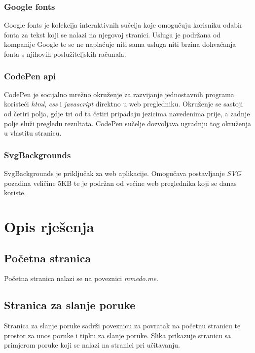 \documentclass[times, utf8, zavrsni, numeric]{fer}
\begin{document}
\subsection{Google fonts}
\qquad Google fonts je kolekcija interaktivnih sučelja koje omogučuju korisniku odabir fonta za tekst koji se nalazi na njegovoj stranici.
Usluga je podržana od kompanije Google te se ne naplaćuje niti sama usluga niti brzina dohvaćanja fonta s njihovih poslužiteljskih računala.
\subsection{CodePen api}
\qquad CodePen je socijalno mrežno okruženje za razvijanje jednostavnih programa koristeći \textit{html}, \textit{css} i \textit{javascript} direktno u web pregledniku.
Okruženje se sastoji od četiri polja, gdje tri od ta četiri pripadaju jezicima navedenima prije, a zadnje polje služi pregledu rezultata.
CodePen sučelje dozvoljava ugradnju tog okruženja u vlastitu stranicu.
\subsection{SvgBackgrounds}
\qquad SvgBackgrounds je priključak za web aplikacije.
Omogučava postavljanje \textit{SVG}\footnotemark{} pozadina veličine 5KB te je podržan od većine web preglednika koji se danas koriste.

\chapter{Opis rješenja}
\section{Početna stranica}
\qquad Početna stranica nalazi se na poveznici \textit{mmedo.me}.
\section{Stranica za slanje poruke}
\qquad Stranica za slanje poruke sadrži poveznicu za povratak na početnu stranicu te prostor za unos poruke i tipku za slanje poruke. Slika prikazuje stranicu sa primjerom poruke koji se nalazi na stranici pri učitavanju.
\end{document}
